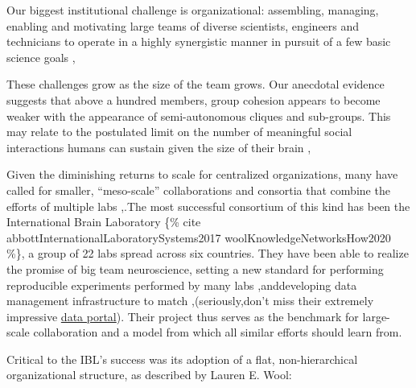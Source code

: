 \documentclass{article}
\begin{document}
\begin{leftbar}
Our biggest institutional challenge is organizational: assembling,
managing, enabling and motivating large teams of diverse scientists,
engineers and technicians to operate in a highly synergistic manner in
pursuit of a few basic science goals \cite{grillnerWorldwideInitiativesAdvance2016},\end{leftbar}
\begin{leftbar}
These challenges grow as the size of the team grows. Our anecdotal
evidence suggests that above a hundred members, group cohesion appears
to become weaker with the appearance of semi-autonomous cliques and
sub-groups. This may relate to the postulated limit on the number of
meaningful social interactions humans can sustain given the size of
their brain \cite{kochBigScienceTeam2016},\end{leftbar}
Given the diminishing returns to scale for centralized organizations,
many have called for smaller, ``meso-scale'' collaborations and
consortia that combine the efforts of multiple labs \cite{mainenBetterWayCrack2016},.The most successful consortium of this
kind has been the International Brain Laboratory \{\% cite
abbottInternationalLaboratorySystems2017 woolKnowledgeNetworksHow2020
\%\}, a group of 22 labs spread across six countries. They have been
able to realize the promise of big team neuroscience, setting a new
standard for performing reproducible experiments performed by many labs
\cite{laboratoryStandardizedReproducibleMeasurement2020},anddeveloping data management infrastructure to match \cite{laboratoryDataArchitectureLargescale2020},(seriously,don't miss
their extremely impressive
\href{https://data.internationalbrainlab.org/}{data portal}). Their
project thus serves as the benchmark for large-scale collaboration and a
model from which all similar efforts should learn from.

Critical to the IBL's success was its adoption of a flat,
non-hierarchical organizational structure, as described by Lauren E.
Wool:
\end{document}
